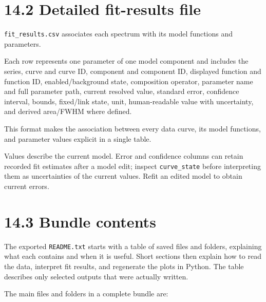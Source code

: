 \documentclass[
  10pt,
  a4paper,
  oneside]{scrreprt}
\begin{document}
\hypertarget{detailed-fit-results-file}{%
\section{14.2 Detailed fit-results
file}\label{detailed-fit-results-file}}

\texttt{fit\_results.csv} associates each spectrum with its model
functions and parameters.

Each row represents one parameter of one model component and includes
the series, curve and curve ID, component and component ID, displayed
function and function ID, enabled/background state, composition
operator, parameter name and full parameter path, current resolved
value, standard error, confidence interval, bounds, fixed/link state,
unit, human-readable value with uncertainty, and derived area/FWHM where
defined.

This format makes the association between every data curve, its model
functions, and parameter values explicit in a single table.

Values describe the current model. Error and confidence columns can
retain recorded fit estimates after a model edit; inspect
\texttt{curve\_state} before interpreting them as uncertainties of the
current values. Refit an edited model to obtain current errors.

\hypertarget{bundle-contents}{%
\section{14.3 Bundle contents}\label{bundle-contents}}

The exported \texttt{README.txt} starts with a table of saved files and
folders, explaining what each contains and when it is useful. Short
sections then explain how to read the data, interpret fit results, and
regenerate the plots in Python. The table describes only selected
outputs that were actually written.

The main files and folders in a complete bundle are:
\end{document}

